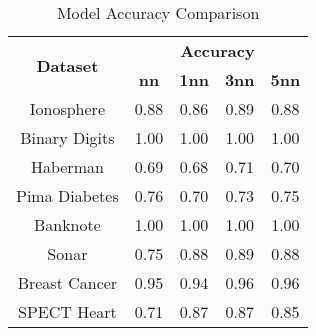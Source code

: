 \begin{table}[htbp]
\caption{Model Accuracy Comparison}
\begin{center}
\begin{tabular}{|c|c|c|c|c|}
\hline
\multirow{2}{*}{\textbf{Dataset}} & \multicolumn{4}{c|}{\textbf{Accuracy}} \\ \cline{2-5}
 & \textbf{nn} & \textbf{1nn} & \textbf{3nn} & \textbf{5nn} \\ \hline
Ionosphere & 0.88 & 0.86 & 0.89 & 0.88 \\ \hline
Binary Digits & 1.00 & 1.00 & 1.00 & 1.00 \\ \hline
Haberman & 0.69 & 0.68 & 0.71 & 0.70 \\ \hline
Pima Diabetes & 0.76 & 0.70 & 0.73 & 0.75 \\ \hline
Banknote & 1.00 & 1.00 & 1.00 & 1.00 \\ \hline
Sonar & 0.75 & 0.88 & 0.89 & 0.88 \\ \hline
Breast Cancer & 0.95 & 0.94 & 0.96 & 0.96 \\ \hline
SPECT Heart & 0.71 & 0.87 & 0.87 & 0.85 \\ \hline
\end{tabular}
\label{tab:accuracy}
\end{center}
\end{table}